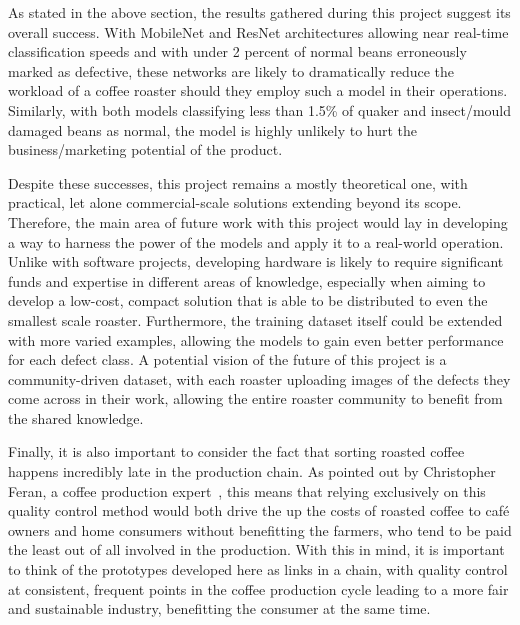 As stated in the above section, the results gathered during this project suggest its overall success.
With MobileNet and ResNet architectures allowing near real-time classification speeds and with under 2 percent of normal beans
erroneously marked as defective, these networks are likely to dramatically reduce the workload of a coffee roaster should they employ such
a model in their operations.
Similarly, with both models classifying less than 1.5\% of quaker and insect/mould damaged beans as normal,
the model is highly unlikely to hurt the business/marketing potential of the product.

Despite these successes, this project remains a mostly theoretical one, with practical, let alone commercial-scale solutions
extending beyond its scope.
Therefore, the main area of future work with this project would lay in developing a way to harness the power of the models
and apply it to a real-world operation.
Unlike with software projects, developing hardware is likely to require significant funds and expertise in different areas of knowledge,
especially when aiming to develop a low-cost, compact solution that is able to be distributed to even the smallest scale roaster.
Furthermore, the training dataset itself could be extended with more varied examples, allowing the models to gain even better
performance for each defect class.
A potential vision of the future of this project is a community-driven dataset, with each roaster uploading images of the defects
they come across in their work, allowing the entire roaster community to benefit from the shared knowledge.

Finally, it is also important to consider the fact that sorting roasted coffee happens incredibly late in the production chain.
As pointed out by Christopher Feran, a coffee production expert~\cite{ferranCoffeeEthics}, this means that relying exclusively on
this quality control method would both drive the up the costs of roasted coffee to café owners and home consumers without benefitting the
farmers, who tend to be paid the least out of all involved in the production.
With this in mind, it is important to think of the prototypes developed here as links in a chain, with quality control at
consistent, frequent points in the coffee production cycle leading to a more fair and sustainable industry, benefitting the
consumer at the same time.